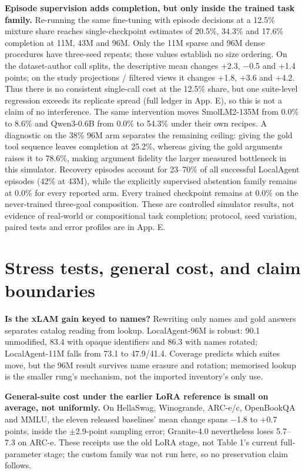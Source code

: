 \documentclass{article}
\begin{document}
\textbf{Episode supervision adds completion, but only inside the trained task family.} Re-running
the same fine-tuning with episode decisions at a 12.5\% mixture share reaches single-checkpoint
estimates of 20.5\%, 34.3\% and 17.6\% completion at 11M, 43M and 96M. Only the 11M sparse and
96M dense procedures have three-seed repeats; these values establish no size ordering. On the
dataset-author call splits, the descriptive mean
changes +2.3, $-$0.5 and +1.4 points; on the study projections / filtered views it changes
+1.8, +3.6 and +4.2. Thus there is no consistent single-call cost at the 12.5\% share, but one
suite-level regression exceeds its replicate spread (full ledger in App. E), so this is not a
claim of no interference. The same intervention moves SmolLM2-135M from 0.0\% to
8.6\% and Qwen3-0.6B from 0.0\% to 54.3\% under their own recipes. A diagnostic on the 38\% 96M
arm separates the remaining ceiling: giving the gold tool sequence leaves completion at 25.2\%,
whereas giving the gold arguments raises it to 78.6\%, making argument fidelity the larger measured
bottleneck in this simulator. Recovery episodes account for 23--70\% of all successful
LocalAgent episodes (42\% at 43M), while the explicitly supervised abstention family remains at
0.0\% for every reported arm. Every trained checkpoint remains at 0.0\% on the never-trained
three-goal composition. These are controlled simulator results, not evidence of real-world or
compositional task completion; protocol, seed variation, paired tests and error profiles are in
App. E.

\section{Stress tests, general cost, and claim boundaries}
\textbf{Is the xLAM gain keyed to names?} Rewriting only names and gold answers separates catalog reading from lookup. LocalAgent-96M is robust: 90.1 unmodified, 83.4 with opaque identifiers and 86.3 with names rotated; LocalAgent-11M falls from 73.1 to 47.9/41.4. Coverage predicts which suites move, but the 96M result survives name erasure and rotation; memorised lookup is the smaller rung's mechanism, not the imported inventory's only use.


\textbf{General-suite cost under the earlier LoRA reference is small on average, not uniformly.}
On HellaSwag, Winogrande, ARC-e/c, OpenBookQA and MMLU, the eleven released baselines' mean change spans $-$1.8 to
+0.7 points, inside the $\pm$2.9-point sampling error; Granite-4.0 nevertheless loses
5.7--7.3 on ARC-e. These receipts use the old LoRA stage, not Table 1's current
full-parameter stage; the custom family was not run here, so no preservation claim follows.
\end{document}
